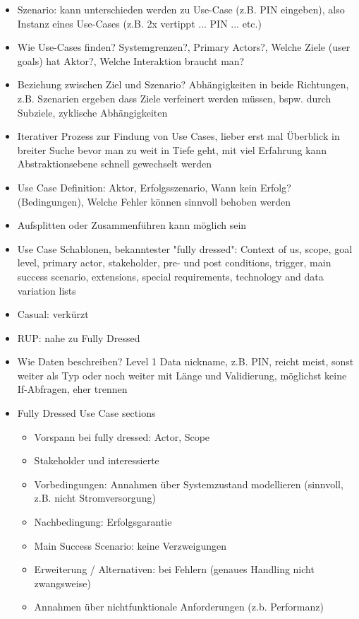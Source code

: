 \documentclass[paper=a4, fontsize=11pt]{scrartcl} %
\numberwithin{equation}{section} %
\numberwithin{figure}{section} %
\numberwithin{table}{section} %
\begin{document}
\begin{itemize}
\begin{itemize}
    \item Szenario: kann unterschieden werden zu Use-Case (z.B. PIN eingeben), also Instanz eines Use-Cases (z.B. 2x vertippt ... PIN ... etc.)
    \item Wie Use-Cases finden? Systemgrenzen?, Primary Actors?, Welche Ziele (user goals) hat Aktor?, Welche Interaktion braucht man?
    \item Beziehung zwischen Ziel und Szenario? Abhängigkeiten in beide Richtungen, z.B. Szenarien ergeben dass Ziele verfeinert werden müssen, bspw. durch Subziele, zyklische Abhängigkeiten
    \item Iterativer Prozess zur Findung von Use Cases, lieber erst mal Überblick in breiter Suche bevor man zu weit in Tiefe geht, mit viel Erfahrung kann Abstraktionsebene schnell gewechselt werden
    \item Use Case Definition: Aktor, Erfolgsszenario, Wann kein Erfolg? (Bedingungen), Welche Fehler können sinnvoll behoben werden
    \item Aufsplitten oder Zusammenführen kann möglich sein
    \item Use Case Schablonen, bekanntester "fully dressed": Context of us, scope, goal level, primary actor, stakeholder, pre- und post conditions, trigger, main success scenario, extensions, special requirements, technology and data variation lists
    \item Casual: verkürzt
    \item RUP: nahe zu Fully Dressed
    \item Wie Daten beschreiben? Level 1 Data nickname, z.B. PIN, reicht meist, sonst weiter als Typ oder noch weiter mit Länge und Validierung, möglichst keine If-Abfragen, eher trennen
    \item Fully Dressed Use Case sections
    \begin{itemize}
      \item Vorspann bei fully dressed: Actor, Scope
      \item Stakeholder und interessierte
      \item Vorbedingungen: Annahmen über Systemzustand modellieren (sinnvoll, z.B. nicht Stromversorgung)
      \item Nachbedingung: Erfolgsgarantie
      \item Main Success Scenario: keine Verzweigungen
      \item Erweiterung / Alternativen: bei Fehlern (genaues Handling nicht zwangsweise)
      \item Annahmen über nichtfunktionale Anforderungen (z.b. Performanz)

\end{itemize}
\end{itemize}
\end{itemize}
\end{document}
